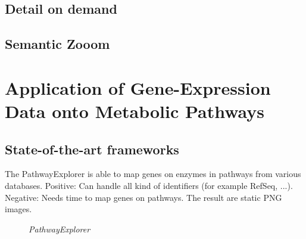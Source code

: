 \subsection{Detail on demand}

\subsection{Semantic Zooom}

\section{Application of Gene-Expression Data onto Metabolic Pathways}


\subsection{State-of-the-art frameworks}


The PathwayExplorer is able to map genes on enzymes in pathways from various databases.
Positive: Can handle all kind of identifiers (for example RefSeq, ...).
Negative: Needs time to map genes on pathways. The result are static PNG images.

\begin{figure}[ht]
\centering
{} 
\caption[PathwayExplorer]{\textit{PathwayExplorer}} 
\label{gfx:pathway_explorer}
\end{figure}


